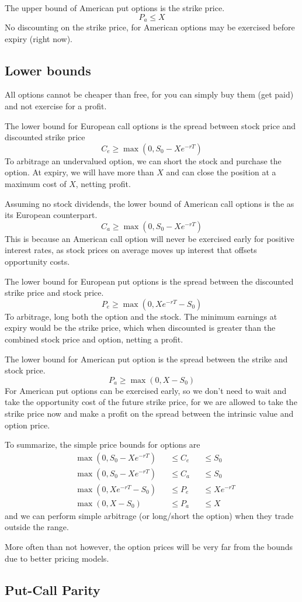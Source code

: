 \documentclass[a4paper,10pt]{article}
\begin{document}
\begin{multicols*}{2}
The upper bound of American put options is the strike price.
\[
    P_a \leq X
\]
No discounting on the strike price, for American options may be exercised before expiry (right now).


\subsection{Lower bounds}
All options cannot be cheaper than free, for you can simply buy them (get paid) and not exercise for a profit.

The lower bound for European call options is the spread between stock price and discounted strike price
\[
    C_e \geq \max(0, S_0 - X e^{-rT})
\]
To arbitrage an undervalued option, we can short the stock and purchase the option. At expiry, we will have more than $X$ and can close the position at a maximum cost of $X$, netting profit.

Assuming no stock dividends, the lower bound of American call options is the as its European counterpart.
\[
    C_a \geq \max(0, S_0 - Xe^{-rT})
\]
This is because an American call option will never be exercised early for positive interest rates, as stock prices on average moves up interest that offsets opportunity costs.

The lower bound for European put options is the spread between the discounted strike price and stock price.
\[
    P_e \geq \max(0, Xe^{-rT} - S_0)
\]
To arbitrage, long both the option and the stock. The minimum earnings at expiry would be the strike price, which when discounted is greater than the combined stock price and option, netting a profit.

The lower bound for American put option is the spread between the strike and stock price.
\[
    P_a \geq \max(0, X - S_0)
\]
For American put options can be exercised early, so we don't need to wait and take the opportunity cost of the future strike price, for we are allowed to take the strike price now and make a profit on the spread between the intrinsic value and option price.

To summarize, the simple price bounds for options are
\begin{alignat*}{3}
    &\max(0, S_0 - Xe^{-rT}) &&\leq C_e &&\leq S_0\\
    &\max(0, S_0 - Xe^{-rT}) &&\leq C_a &&\leq S_0\\
    &\max(0, X e^{-rT} - S_0) &&\leq P_e &&\leq Xe^{-rT}\\
    &\max(0, X - S_0) &&\leq P_a &&\leq X
\end{alignat*}
and we can perform simple arbitrage (or long/short the option) when they trade outside the range.

More often than not however, the option prices will be very far from the bounds due to better pricing models.

\subsection{Put-Call Parity}


\end{multicols*}
\end{document}
